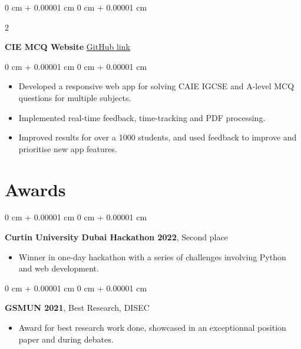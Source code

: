\documentclass[10pt, letterpaper]{article}
\newenvironment{highlights}{
    \begin{itemize}[
        topsep=0.10 cm,
        parsep=0.10 cm,
        partopsep=0pt,
        itemsep=0pt,
        leftmargin=0 cm + 10pt
    ]
}{
    \end{itemize}
} %
\newenvironment{onecolentry}{
    \begin{adjustwidth}{
        0 cm + 0.00001 cm
    }{
        0 cm + 0.00001 cm
    }
}{
    \end{adjustwidth}
} %
\newenvironment{twocolentry}[2][]{
    \onecolentry
    \def\secondColumn{#2}
    \setcolumnwidth{\fill, 4.5 cm}
    \begin{paracol}{2}
}{
    \switchcolumn \raggedleft \secondColumn
    \end{paracol}
    \endonecolentry
} %
\begin{document}
        \begin{twocolentry}{
            \href{https://github.com/Abban-Fahim/MCQ/}{GitHub link}
        }
            \textbf{CIE MCQ Website}\end{twocolentry}

        \vspace{0.10 cm}
        \begin{onecolentry}
            \begin{highlights}
                \item Developed a responsive web app for solving CAIE IGCSE and A-level MCQ questions for multiple subjects.
                \item Implemented real-time feedback, time-tracking and PDF processing.
                \item Improved results for over a 1000 students, and used feedback to improve and prioritise new app features.
            \end{highlights}
        \end{onecolentry} 
    
    \section{Awards}

        \begin{onecolentry}
            \textbf{Curtin University Dubai Hackathon 2022}, Second place
            \begin{highlights}
                \item Winner in one-day hackathon with a series of challenges involving Python and web development.
            \end{highlights}

        \end{onecolentry}

        \vspace{0.2 cm}

        \begin{onecolentry}
            \textbf{GSMUN 2021}, Best Research, DISEC
            \begin{highlights}
                \item Award for best research work done, showcased in an exceptionnal position paper and during debates.
            \end{highlights}
        \end{onecolentry}
\end{document}
